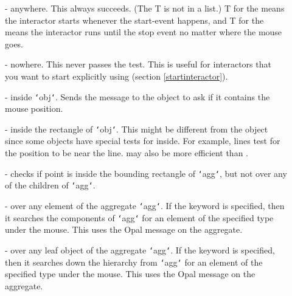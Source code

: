 \begin{description}
\item[]  - anywhere.  This always succeeds.  (The T is not in a list.)  T for
the  means the interactor starts whenever the start-event
happens, and T for the  means the interactor runs until
the stop event no matter where the mouse goes.

\item[]  - nowhere.  This never passes the test.  This is useful for
interactors that you want to start explicitly using 
(section \ref{startinteractor}).

\item[]  - inside {\tt\char`\<}obj{\tt\char`\>}.  Sends the 
message to the object to ask if it contains the mouse position.

\item[]  - inside the rectangle of {\tt\char`\<}obj{\tt\char`\>}.  This
might be different from  the object since
some objects have special tests for inside.  For example, lines test for
the position to be near the line.   may also be more
efficient than .

\item[]  - checks if point is
inside the bounding rectangle of {\tt\char`\<}agg{\tt\char`\>}, but not over any of the
children of {\tt\char`\<}agg{\tt\char`\>}.

\item[]  - over any
element of the
aggregate {\tt\char`\<}agg{\tt\char`\>}.  If the  keyword is specified, then it searches
the components of {\tt\char`\<}agg{\tt\char`\>} for an element of the specified
type under the mouse.
This uses the Opal message  on the aggregate.

\item[]  -
over any leaf object of the
aggregate {\tt\char`\<}agg{\tt\char`\>}.  If the  keyword is specified, then it searches
down the hierarchy from {\tt\char`\<}agg{\tt\char`\>} for an element of the specified
type under the mouse.
This uses the Opal message  on the aggregate.


\end{description}
